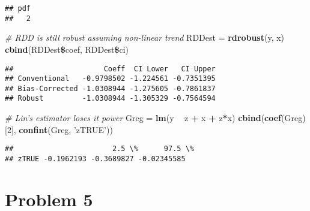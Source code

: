 \documentclass[]{article}
\newenvironment{Shaded}{\begin{snugshade}}{\end{snugshade}}
\newcommand{\KeywordTok}[1]{\textcolor[rgb]{0.13,0.29,0.53}{\textbf{#1}}}
\newcommand{\DecValTok}[1]{\textcolor[rgb]{0.00,0.00,0.81}{#1}}
\newcommand{\StringTok}[1]{\textcolor[rgb]{0.31,0.60,0.02}{#1}}
\newcommand{\CommentTok}[1]{\textcolor[rgb]{0.56,0.35,0.01}{\textit{#1}}}
\newcommand{\OperatorTok}[1]{\textcolor[rgb]{0.81,0.36,0.00}{\textbf{#1}}}
\newcommand{\NormalTok}[1]{#1}
\begin{document}
\begin{verbatim}
## pdf 
##   2
\end{verbatim}

\begin{Shaded}
\begin{Highlighting}[]
\CommentTok{# RDD is still robust assuming non-linear trend}
\NormalTok{RDDest =}\StringTok{ }\KeywordTok{rdrobust}\NormalTok{(y, x)}
\KeywordTok{cbind}\NormalTok{(RDDest}\OperatorTok{\$}\NormalTok{coef, RDDest}\OperatorTok{\$}\NormalTok{ci)}
\end{Highlighting}
\end{Shaded}

\begin{verbatim}
##                     Coeff  CI Lower   CI Upper
## Conventional   -0.9798502 -1.224561 -0.7351395
## Bias-Corrected -1.0308944 -1.275605 -0.7861837
## Robust         -1.0308944 -1.305329 -0.7564594
\end{verbatim}

\begin{Shaded}
\begin{Highlighting}[]
\CommentTok{# Lin's estimator loses it power}
\NormalTok{Greg =}\StringTok{ }\KeywordTok{lm}\NormalTok{(y }\OperatorTok{~}\StringTok{ }\NormalTok{z }\OperatorTok{+}\StringTok{ }\NormalTok{x }\OperatorTok{+}\StringTok{ }\NormalTok{z}\OperatorTok{*}\NormalTok{x)}
\KeywordTok{cbind}\NormalTok{(}\KeywordTok{coef}\NormalTok{(Greg)[}\DecValTok{2}\NormalTok{], }\KeywordTok{confint}\NormalTok{(Greg, }\StringTok{'zTRUE'}\NormalTok{))}
\end{Highlighting}
\end{Shaded}

\begin{verbatim}
##                       2.5 \%      97.5 \%
## zTRUE -0.1962193 -0.3689827 -0.02345585
\end{verbatim}

\section*{Problem 5}
\end{document}
